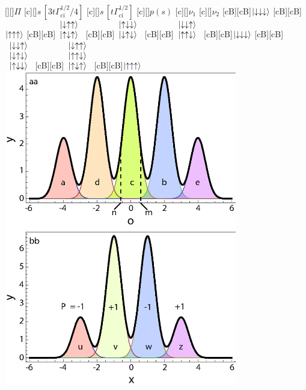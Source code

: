 

\figstyle
    [][]{$\Pi$}
    [c][]{$s\,[3t\Gamma_\text{ci}^{1/2}/4]$}
    [c][]{$s\,[t\Gamma_\text{ci}^{1/2}]$}
    [c][]{$p(s)$}
    [c][]{\figsmall$\nu_1$}
    [c][]{\figsmall$\nu_2$}
    [cB][cB]{\figsmaller$\left\lvert \downarrow\downarrow\downarrow \right\rangle$}
    [cB][cB]{\figsmaller$\left\lvert \uparrow\uparrow\uparrow \right\rangle$}
    [cB][cB]{\figsmaller$
\begin{array}[b]{c}
\left\lvert \downarrow\uparrow\uparrow \right\rangle\\
\left\lvert \uparrow\downarrow\uparrow \right\rangle
\end{array}$
} [cB][cB]{\figsmaller$
\begin{array}[b]{c}
\left\lvert \uparrow\downarrow\downarrow \right\rangle\\
\left\lvert \downarrow\uparrow\downarrow \right\rangle
\end{array}$
} [cB][cB]{\figsmaller$
\begin{array}[b]{c}
\left\lvert \downarrow\downarrow\uparrow \right\rangle\\
\left\lvert \uparrow\uparrow\downarrow \right\rangle
\end{array}$
}
    [cB][cB]{\figsmaller$\left\lvert \downarrow\downarrow\downarrow \right\rangle$}
    [cB][cB]{\figsmaller$
\begin{array}[b]{c}
\left\lvert \downarrow\downarrow\uparrow \right\rangle\\
\left\lvert \downarrow\uparrow\downarrow \right\rangle\\
\left\lvert \uparrow\downarrow\downarrow \right\rangle
\end{array}$
}
    [cB][cB]{\figsmaller$
\begin{array}[b]{c}
\left\lvert \downarrow\uparrow\uparrow \right\rangle\\
\left\lvert \uparrow\uparrow\downarrow \right\rangle\\
\left\lvert \uparrow\downarrow\uparrow \right\rangle
\end{array}$
}
[cB][cB]{\figsmaller$\left\lvert \uparrow\uparrow\uparrow \right\rangle$}
\includegraphics[width=4in]{ghz1.eps}

